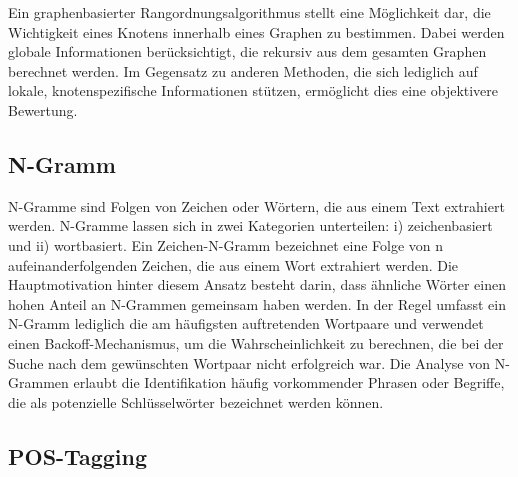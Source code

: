 Ein graphenbasierter Rangordnungsalgorithmus stellt eine Möglichkeit dar, die Wichtigkeit eines Knotens innerhalb eines Graphen zu bestimmen. Dabei werden globale Informationen berücksichtigt, die rekursiv aus dem gesamten Graphen berechnet werden. Im Gegensatz zu anderen Methoden, die sich lediglich auf lokale, knotenspezifische Informationen stützen, ermöglicht dies eine objektivere Bewertung.\cite{mihalcea2004textrank}

\subsection{N-Gramm}
N-Gramme sind Folgen von Zeichen oder Wörtern, die aus einem Text extrahiert werden. N-Gramme lassen sich in zwei Kategorien unterteilen: i) zeichenbasiert und ii) wortbasiert. Ein Zeichen-N-Gramm bezeichnet eine Folge von n aufeinanderfolgenden Zeichen, die aus einem Wort extrahiert werden. Die Hauptmotivation hinter diesem Ansatz besteht darin, dass ähnliche Wörter einen hohen Anteil an N-Grammen gemeinsam haben werden. In der Regel umfasst ein N-Gramm lediglich die am häufigsten auftretenden Wortpaare und verwendet einen Backoff-Mechanismus, um die Wahrscheinlichkeit zu berechnen, die bei der Suche nach dem gewünschten Wortpaar nicht erfolgreich war. \cite{majumder2002n} Die Analyse von N-Grammen erlaubt die Identifikation häufig vorkommender Phrasen oder Begriffe, die als potenzielle Schlüsselwörter bezeichnet werden können.

\subsection{POS-Tagging}

